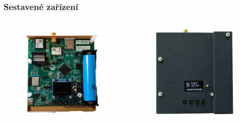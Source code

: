 \documentclass[%
  12pt,       				%
	t,                  %
	aspectratio=1610,   %
	unicode,						%
]{beamer}				    	%
\begin{document}
\begin{frame} 
	\frametitle{Sestavené zařízení}
	\begin{columns}[T] 								%
		\begin{column}{0.5\textwidth}		%
		\begin{figure}%
		\centering
		\includegraphics[width=0.9\columnwidth]{obrazky/imuNavPCB}
		\end{figure}
		\end{column}
		\begin{column}{0.5\textwidth}		%
		\begin{figure}%
		\centering
		\includegraphics[width=0.9\columnwidth]{obrazky/ImunavFront}

\end{figure}
\end{column}
\end{columns}
\end{frame}
\end{document}
